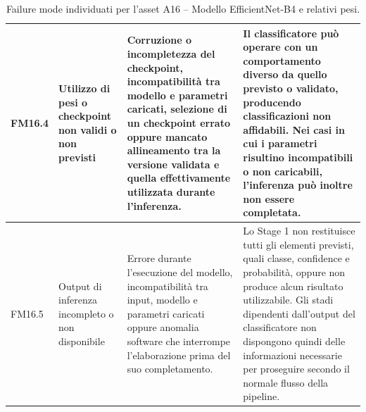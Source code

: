 \begin{table}[H]
\begin{tabularx}{\textwidth}{
        >{\raggedright\arraybackslash}p{1.1cm}
        >{\raggedright\arraybackslash}p{3cm}
        >{\raggedright\arraybackslash}p{5cm}
        X
    }
        \midrule

        FM16.4 &
        Utilizzo di pesi o checkpoint non validi o non previsti &
        Corruzione o incompletezza del checkpoint, incompatibilità tra
        modello e parametri caricati, selezione di un checkpoint errato
        oppure mancato allineamento tra la versione validata e quella
        effettivamente utilizzata durante l'inferenza. &
        Il classificatore può operare con un comportamento diverso da
        quello previsto o validato, producendo classificazioni non
        affidabili. Nei casi in cui i parametri risultino incompatibili
        o non caricabili, l'inferenza può inoltre non essere completata. \\

        \midrule

        FM16.5 &
        Output di inferenza incompleto o non disponibile &
        Errore durante l'esecuzione del modello, incompatibilità tra input,
        modello e parametri caricati oppure anomalia software che interrompe
        l'elaborazione prima del suo completamento. &
        Lo Stage 1 non restituisce tutti gli elementi previsti, quali classe,
        confidence e probabilità, oppure non produce alcun risultato utilizzabile.
        Gli stadi dipendenti dall'output del classificatore non dispongono quindi
        delle informazioni necessarie per proseguire secondo il normale flusso
        della pipeline. \\

        \bottomrule
    \end{tabularx}

    \caption{Failure mode individuati per l'asset A16 -- Modello EfficientNet-B4 e relativi pesi.}
    \label{tab:a16-failure-modes}
\end{table}